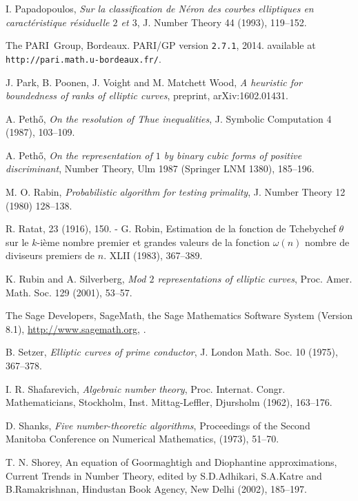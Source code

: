 \begin{thebibliography}{}
I. Papadopoulos,
\emph{Sur la classification de N\'eron des courbes elliptiques  
en caract\'eristique r\'esiduelle $2$ et $3$}, 
J. Number Theory 44 (1993), 119--152.

The PARI~Group, Bordeaux.
PARI/GP version {\tt 2.7.1}, 2014.
available at {\tt http://pari.math.u-bordeaux.fr/}.

J. Park, B. Poonen, J. Voight and M. Matchett Wood,
\emph{A heuristic for boundedness of ranks of elliptic curves},
preprint, arXiv:1602.01431.

A. Peth\H{o},
\emph{On the resolution of Thue inequalities},
J. Symbolic Computation 4 (1987), 103--109.

A. Peth\H{o},
\emph{On the representation of $1$ by binary cubic forms of positive discriminant},
Number Theory, Ulm 1987 (Springer LNM 1380), 185--196.

M. O. Rabin, 
 \emph{Probabilistic algorithm for testing primality}, J.
Number Theory 12 (1980) 128--138.

R. Ratat,
 23 (1916), 150.
-
G. Robin,
\newblock Estimation de la fonction de Tchebychef $\theta$ sur le $k$-i\`eme nombre premier et grandes valeurs de la fonction $\omega (n)$ nombre de diviseurs premiers de $n$.
 XLII (1983), 367--389.

K. Rubin and A. Silverberg,
\emph{Mod $2$ representations of elliptic curves}, Proc. Amer. Math. Soc. 129 (2001), 53--57.

The Sage Developers,
\newblock SageMath, the Sage Mathematics Software System (Version 8.1),
 \newblock \url{http://www.sagemath.org},
.

B. Setzer,
\emph{Elliptic curves of prime conductor},
J. London Math. Soc. 10 (1975), 367--378.

I. R. Shafarevich,
\emph{Algebraic number theory}, Proc. Internat. Congr. Mathematicians,
Stockholm, Inst. Mittag-Leffler, Djursholm (1962), 163--176.

D. Shanks,
\emph{Five number-theoretic algorithms},
 Proceedings of the Second Manitoba Conference on Numerical Mathematics, (1973), 51--70.

T. N. Shorey,
\newblock An equation of Goormaghtigh and Diophantine approximations,
\newblock Current Trends in Number Theory, edited by S.D.Adhikari, S.A.Katre and B.Ramakrishnan, Hindustan Book Agency, New Delhi (2002), 185--197.


\end{thebibliography}
